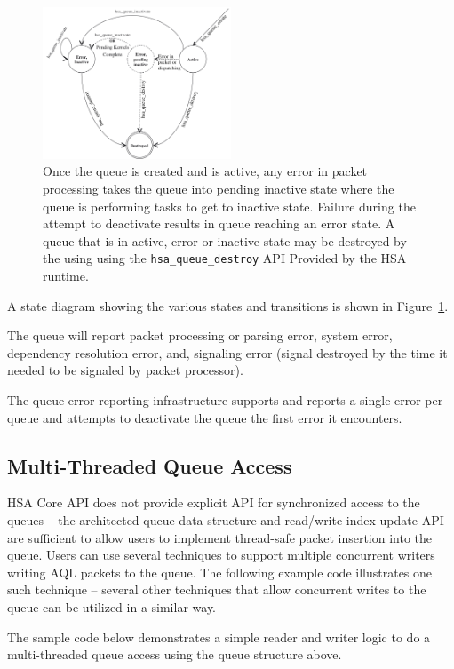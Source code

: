\begin{figure}
  \centering
  \includegraphics[width=0.5\textwidth] {queuestate}
  \centering
  \caption{Once the queue is created and is active, any error in
          packet processing takes the queue into pending inactive
          state where the queue is performing tasks to get to
          inactive state. Failure during the attempt to deactivate
          results in queue reaching an error state. A queue that is
          in active, error or inactive state may be destroyed by the
          using using the \texttt{hsa\_queue\_destroy} API Provided by
  the HSA runtime.}
  \label{fig:queuestate}
\end{figure}

A state diagram showing the various states and transitions is shown
in Figure~\ref{fig:queuestate}.

The queue will report packet processing or parsing error, system
error, dependency resolution error, and, signaling error (signal
destroyed by the time it needed to be signaled by packet processor).

The queue error reporting infrastructure supports and reports a
single error per queue and attempts to deactivate the queue the
first error it encounters.

\hypertarget{coreapi_multithreading}{}\subsection{Multi-\/\-Threaded
Queue Access}\label{coreapi_multithreading}
H\-S\-A Core API does not provide explicit API for synchronized
access to the queues -- the architected queue data structure and
read/write index update API are
sufficient to allow users to implement thread-safe packet insertion
into the queue. Users can use several techniques to support
multiple concurrent writers writing AQL packets to the queue.  The
following example code illustrates one such technique -- several
other techniques that allow concurrent writes to the queue can be
utilized in a similar way.

The sample code below demonstrates a simple reader and writer logic
to do a multi-threaded queue access using the queue structure above.

\begin{framed}

\end{framed}

